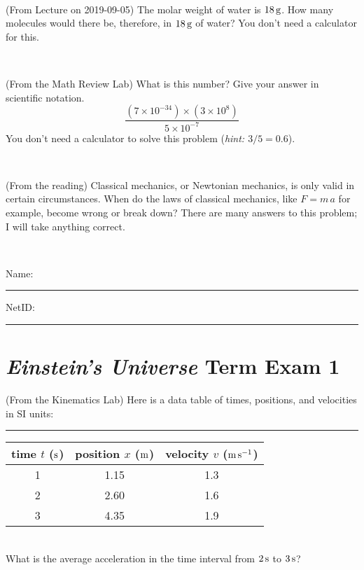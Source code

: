 \documentclass[12pt, letterpaper]{article}
\begin{document}
\vfill ~

\begin{problem} (From Lecture on 2019-09-05)
The molar weight of water is $18\,\mathrm{g}$. How many molecules would there
be, therefore, in $18\,\mathrm{g}$ of water? You don't need a calculator for
this.
\end{problem}


\vfill ~

\begin{problem} (From the Math Review Lab)
What is this number? Give your answer in scientific notation.
$$
\frac{(7\times10^{-34})\times(3\times10^8)}{5\times10^{-7}}
$$
You don't need a calculator to solve this problem (\textit{hint: $3/5=0.6$}).
\end{problem}


\vfill ~

\begin{problem} (From the reading)
Classical mechanics, or Newtonian mechanics, is only valid in certain
circumstances. When do the laws of classical mechanics, like $F =
m\,a$ for example, become wrong or break down? There are many answers
to this problem; I will take anything correct.
\end{problem}


\vfill ~


\cleardoublepage



\noindent
Name: \rule[-1ex]{0.60\textwidth}{0.1pt}
NetID: \rule[-1ex]{0.20\textwidth}{0.1pt}

\section*{\textsl{Einstein's Universe} Term Exam 1}
\setcounter{problem}{1}


\begin{problem} (From the Kinematics Lab)
Here is a data table of times, positions, and velocities in SI units:\\
\rule{1.0in}{0pt}\begin{tabular}{c|c|c}
time $t$ ($\mathrm{s}$) & position $x$ ($\mathrm{m}$) & velocity $v$ ($\mathrm{m}\,\mathrm{s}^{-1}$) \\
\hline
1 & 1.15 & 1.3 \\
2 & 2.60 & 1.6 \\
3 & 4.35 & 1.9 \\
\hline
\end{tabular}\\
What is the average acceleration in the time interval from $2\,\mathrm{s}$ to $3\,\mathrm{s}$?
\end{problem}
\end{document}
